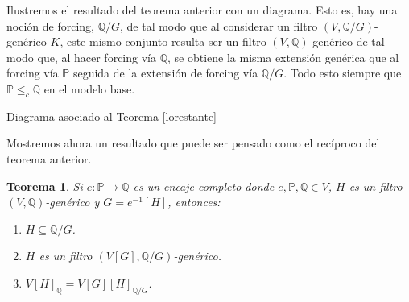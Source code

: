 \documentclass[11pt]{unam_tesis1}
\theoremstyle{MyThmStyle}
\theoremstyle{definition}
\theoremstyle{plain}
\newtheorem{theorem}[definition]{Teorema}
\theoremstyle{remark}
\let\leq\leqslant
\begin{document}
Ilustremos el resultado del teorema anterior con un diagrama. Esto es, hay una noci\'on de forcing, $\mathbb Q/G$, de tal modo que al considerar un filtro $(V,\mathbb Q/G)$-gen\'erico $K$, este mismo conjunto resulta ser un filtro $(V,\mathbb Q)$-gen\'erico de tal modo que, al hacer forcing v\'ia $\mathbb Q$, se obtiene la misma extensi\'on gen\'erica que al forcing v\'ia $\mathbb P$ seguida de la extensi\'on de forcing v\'ia $\mathbb Q/G$. Todo esto siempre que $\mathbb P\leq_c\mathbb Q$ en el modelo base.

\begin{center}

\centering

Diagrama asociado al Teorema \ref{lorestante}

\end{center}

Mostremos ahora un resultado que puede ser pensado como el rec\'iproco del teorema anterior.

\begin{theorem}\label{primerreciproco}
Si $e:\mathbb P\to \mathbb Q$ es un encaje completo donde $e,\mathbb P, \mathbb Q\in V$, $H$ es un filtro $(V,\mathbb Q)$-gen\'erico y $G=e^{-1}[H]$, entonces:
\begin{enumerate}

\item $H\subseteq \mathbb Q/G$.
\item $H$ es un filtro $(V[G], \mathbb Q/G)$-gen\'erico.
\item $V[H]_{\mathbb Q}=V[G][H]_{\mathbb Q/G}$.
\end{enumerate}

\end{theorem}
\end{document}
